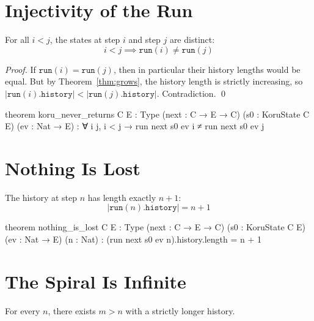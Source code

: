 \section{Injectivity of the Run}

\begin{theorem}\label{thm:never-returns}
For all $i < j$, the states at step $i$ and step $j$ are distinct:
\[
i < j \implies \texttt{run}(i) \neq \texttt{run}(j)
\]
\end{theorem}

\begin{proof}
If $\texttt{run}(i) = \texttt{run}(j)$, then in particular their history lengths would be equal. But by Theorem~\ref{thm:grows}, the history length is strictly increasing, so $|\texttt{run}(i).\texttt{history}| < |\texttt{run}(j).\texttt{history}|$. Contradiction. \qed
\end{proof}

\begin{leancode}
theorem koru_never_returns {C E : Type} (next : C → E → C)
    (s0 : KoruState C E) (ev : Nat → E) :
    ∀ i j, i < j → run next s0 ev i ≠ run next s0 ev j
\end{leancode}

\section{Nothing Is Lost}

\begin{theorem}\label{thm:exact-length}
The history at step $n$ has length exactly $n + 1$:
\[
|\texttt{run}(n).\texttt{history}| = n + 1
\]
\end{theorem}

\begin{leancode}
theorem nothing_is_lost {C E : Type} (next : C → E → C)
    (s0 : KoruState C E) (ev : Nat → E) (n : Nat) :
    (run next s0 ev n).history.length = n + 1
\end{leancode}

\section{The Spiral Is Infinite}

\begin{theorem}\label{thm:infinite}
For every $n$, there exists $m > n$ with a strictly longer history.
\end{theorem}

